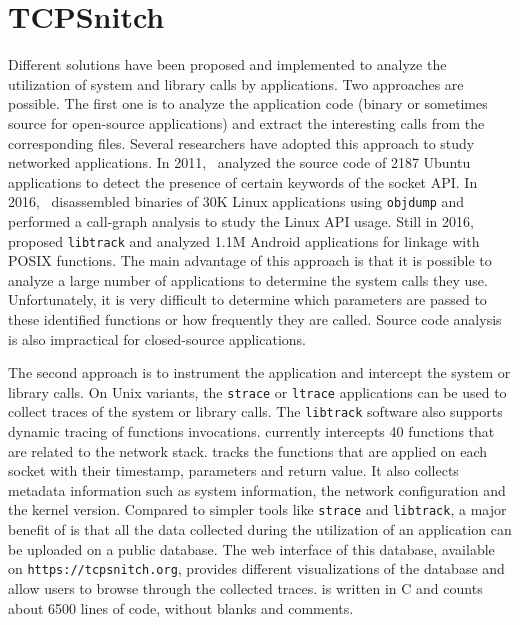 \section{TCPSnitch}\label{sec:tcpsnitch}

Different solutions have been proposed and implemented to analyze the
utilization of system and library calls by applications. Two
approaches are possible. The first one is to analyze the
application code (binary or sometimes source for open-source
applications) and extract the interesting calls from the corresponding
files. Several researchers have adopted this approach to study
networked applications. In 2011,~\cite{Komu:Sockets} analyzed the source
code of 2187 Ubuntu applications to detect the presence of certain keywords
of the socket API. In 2016,~\cite{Tsai:LinuxAPI} disassembled
binaries of 30K Linux applications using \texttt{objdump} and performed
a call-graph analysis to study the Linux API usage. Still in 2016,
~\cite{Atlidakis:POSIX} proposed \texttt{libtrack} and analyzed 1.1M Android
applications for linkage with POSIX functions. The main advantage of this
approach is that it is possible to analyze a large number of applications to
determine the system calls they use. 
Unfortunately, it is very difficult to determine
which parameters are passed to these identified functions or how
frequently they are called. Source code analysis is also impractical for
closed-source applications.

The second approach is to instrument the application and intercept the
system or library calls. On Unix variants, the \texttt{strace} or
\texttt{ltrace} applications can be used to collect traces of the
system or library calls. The \texttt{libtrack} software
\cite{Atlidakis:POSIX} also supports dynamic tracing of functions invocations.
\tcpsnitch currently intercepts 40 functions that are related to the network
stack. \tcpsnitch tracks the functions that are applied on each
socket with their timestamp, parameters and return value.
It also collects metadata information such as system information,
the network configuration and the kernel version. Compared to simpler
tools like \texttt{strace} and \texttt{libtrack}, a major benefit of
\tcpsnitch is that all the data collected during the utilization of an
application can be uploaded on a public database. The web interface of this 
database, available on \texttt{https://tcpsnitch.org}, provides different
visualizations of the database and allow users to browse through the
collected traces. \tcpsnitch is written in C and
counts about 6500 lines of code, without blanks and comments.

